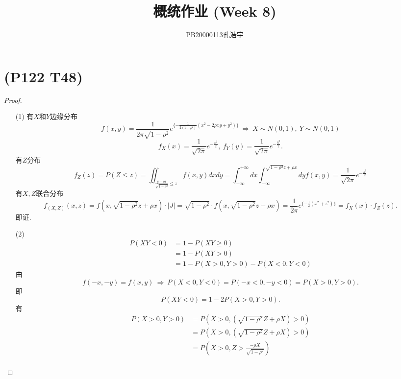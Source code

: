 \documentclass{article}
\title{概统作业 (Week 8)}
\author{PB20000113孔浩宇}
\begin{document}
\maketitle
\section{(P122 T48)}  %
\begin{proof}
    \begin{enumerate}
        \item []
        \item [(1)]
        有$X$和$Y$边缘分布
        \[
            f(x,y) = 
            \frac{1}{2\pi \sqrt{1-\rho^2}} 
            e^{\{-\frac{1}{2(1-\rho^2)} (x^2 - 2\rho xy + y^2) \}}  
            \ \Rightarrow\ 
            X\sim N(0,1),\ Y\sim N(0,1)
        \]
        \[
            f_{X} (x) = \frac{1}{\sqrt{2\pi}} e^{-\frac{x^2}{2}},\ 
            f_{Y} (y) = \frac{1}{\sqrt{2\pi}} e^{-\frac{y^2}{2}}.
        \]
        有$Z$分布
        \[
            f_{Z} (z) = P(Z \leq z) 
            = \iint_{\frac{y-\rho x}{\sqrt{1-\rho^2}} \leq z} f(x,y) dx dy
            = \int_{-\infty}^{+\infty} dx \int_{-\infty}^{\sqrt{1-\rho^2}z + \rho x}dy f(x,y)
            = \frac{1}{\sqrt{2\pi}} e^{-\frac{z^2}{2}}  
        \]
        有$X,Z$联合分布
        \[
            f_{(X,Z)} (x,z) 
            = f(x, \sqrt{1-\rho^2}z + \rho x) \cdot |J|
            = \sqrt{1- \rho^2} \cdot f(x, \sqrt{1-\rho^2}z + \rho x)
            = \frac{1}{2\pi} e^{\{-\frac{1}{2} (x^2 + z^2) \}}  
            = f_{X}(x) \cdot f_{Z}(z) .
        \]
        即证.
        \item [(2)]
        \begin{align*}
            P(XY<0) 
            & = 1 - P(XY\geq 0)\\
            & = 1 - P(XY > 0)\\
            & = 1 - P(X>0, Y>0) - P(X<0, Y<0)
        \end{align*}
        由
        \[
            f(-x, -y) = f(x,y) 
            \ \Rightarrow\ 
            P(X<0,Y<0) = P(-x <0 , -y<0) = P(X>0, Y>0).    
        \]
        即
        \[
            P(XY<0) = 1 - 2P(X>0, Y>0).
        \]
        有
        \begin{align*}
            P(X>0, Y>0) 
            & = P(X>0, (\sqrt{1-\rho^2} Z + \rho X) > 0) \\  
            & = P(X>0 , (\sqrt{1-\rho^2} Z + \rho X) > 0) \\
            & = P(X>0 , Z > \frac{-\rho X}{\sqrt{1-\rho^2}}) \\

\end{align*}
\end{enumerate}
\end{proof}
\end{document}
